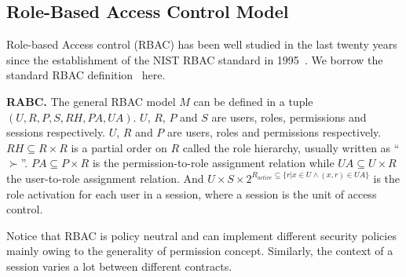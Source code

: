 %


\subsection{Role-Based Access Control Model}
Role-based Access control (RBAC) has been well studied in the last twenty years since the establishment of the NIST RBAC standard in 1995~\cite{sandhu2000nist}.
We borrow the standard RBAC definition~\cite{sandhu1998} here.
\begin{definition}
	\label{def: RBAC}
	\textbf{RABC.} The general RBAC model $M$ can be defined in a tuple 
	$(U, R, P, S, \mathit{RH}, \mathit{PA}, \mathit{UA})$.
	$U$, $R$, $P$ and $S$ are users, roles, permissions and sessions respectively.
	$U$, $R$ and $P$ are users, roles and permissions respectively.
	$\mathit{RH} \subseteq R \times R$ is a partial order on $R$ called the role hierarchy, usually
	written as ``$\succ$''.
	$\mathit{PA} \subseteq P \times R $ is the permission-to-role assignment relation while
	$\mathit{UA} \subseteq U \times R$ the user-to-role assignment relation.
	And $U \times S \times 2^{R_\mathit{active}\subseteq\{r|x \in U \land (x,r) \in \mathit{UA}\}}$ is the role activation for each user in a session, where a session is the unit of access control.
\end{definition}


Notice that RBAC is policy neutral and can implement different security policies mainly owing to the generality of permission concept.
Similarly, the context of a session varies a lot between different contracts.



